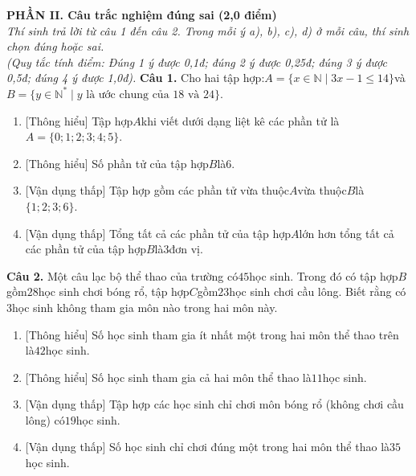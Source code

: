 \documentclass[11pt,a4paper]{article}
\begin{document}
\vspace{6pt}
\noindent
\textbf{\large PHẦN II. Câu trắc nghiệm đúng sai (2,0 điểm)}\\
\textit{\small Thí sinh trả lời từ câu 1 đến câu 2. Trong mỗi ý a), b), c), d) ở mỗi câu, thí sinh chọn đúng hoặc sai.}\\
\textit{\small (Quy tắc tính điểm: Đúng 1 ý được 0,1đ; đúng 2 ý được 0,25đ; đúng 3 ý được 0,5đ; đúng 4 ý được 1,0đ).}
\vspace{6pt}
\noindent\textbf{Câu 1.} Cho hai tập hợp:$A = \{x \in \mathbb{N} \mid 3x - 1 \le 14\}$và$B = \{y \in \mathbb{N}^* \mid y \text{ là ước chung của } 18 \text{ và } 24\}$.\par\vspace{2pt}
\begin{enumerate}[label=\textbf{\alph*)}, leftmargin=1.2cm, itemsep=2pt, topsep=2pt]
  \item \textnormal{[Thông hiểu]} Tập hợp$A$khi viết dưới dạng liệt kê các phần tử là$A = \{0; 1; 2; 3; 4; 5\}$.
  \item \textnormal{[Thông hiểu]} Số phần tử của tập hợp$B$là$6$.
  \item \textnormal{[Vận dụng thấp]} Tập hợp gồm các phần tử vừa thuộc$A$vừa thuộc$B$là$\{1; 2; 3; 6\}$.
  \item \textnormal{[Vận dụng thấp]} Tổng tất cả các phần tử của tập hợp$A$lớn hơn tổng tất cả các phần tử của tập hợp$B$là$3$đơn vị.
\end{enumerate}
\vspace{6pt}

\noindent\textbf{Câu 2.} Một câu lạc bộ thể thao của trường có$45$học sinh. Trong đó có tập hợp$B$gồm$28$học sinh chơi bóng rổ, tập hợp$C$gồm$23$học sinh chơi cầu lông. Biết rằng có$3$học sinh không tham gia môn nào trong hai môn này.\par\vspace{2pt}
\begin{enumerate}[label=\textbf{\alph*)}, leftmargin=1.2cm, itemsep=2pt, topsep=2pt]
  \item \textnormal{[Thông hiểu]} Số học sinh tham gia ít nhất một trong hai môn thể thao trên là$42$học sinh.
  \item \textnormal{[Thông hiểu]} Số học sinh tham gia cả hai môn thể thao là$11$học sinh.
  \item \textnormal{[Vận dụng thấp]} Tập hợp các học sinh chỉ chơi môn bóng rổ (không chơi cầu lông) có$19$học sinh.
  \item \textnormal{[Vận dụng thấp]} Số học sinh chỉ chơi đúng một trong hai môn thể thao là$35$học sinh.
\end{enumerate}
\vspace{6pt}
\end{document}
